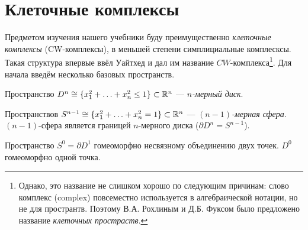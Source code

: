 \documentclass[10pt, twoside]{article}
\begin{document}
\pagestyle{empty}


\newpage

\tableofcontents
\newpage

\setcounter{page}{1}
\pagestyle{fancy}

\section{Клеточные комплексы}
Предметом изучения нашего учебники буду преимущественно \emph{клеточные комплексы} (CW-комплексы), в меньшей степени симплициальные комплесксы. Такая структура впервые ввёл Уайтхед и дал им название $CW$-комплекса\footnote{Однако, это название не слишком хорошо по следующим причинам: слово комплекс (complex) повсеместно используется в алгебраической нотации, но не для пространтв. Поэтому В.А. Рохлиным и Д.Б. Фуксом было предложено название \emph{клеточных простраств}.}.  %
Для начала введём несколько базовых пространств.

\begin{definition}
    Пространство $D^n \cong \{x_1^2 + \ldots + x_n^2 \leq 1\} \subset \mathbb R^n$ --- \emph{$n$-мерный диск}. 
\end{definition}
\begin{definition}
    Пространствов $S^{n-1} \cong \{x_1^2 + \ldots + x_n^2 = 1\} \subset \mathbb R^n$ --- \emph{$(n-1)$-мерная сфера}.
    $(n-1)$-сфера является границей $n$-мерного диска ($\partial D^n = S^{n-1}$).
\end{definition}

\begin{remark}
    Пространство $S^0 = \partial D^1$ гомеоморфно несвязному объединению двух точек. $D^0$ гомеоморфно одной точка.
\end{remark}
\end{document}

